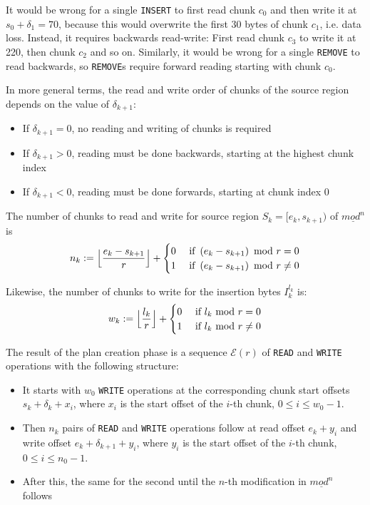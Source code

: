 \documentclass[english, 10pt, openright, twocolumn, landscape, twoside, notitlepage, a4paper, pdftex]		
{article}
\begin{document}
It would be wrong for a single \texttt{INSERT} to first read chunk $c_{0}$ and then write it at $s_{0}+\delta_{1}=70$, because this would overwrite the first 30 bytes of chunk $c_{1}$, i.e. data loss. Instead, it requires backwards read-write: First read chunk $c_{3}$ to write it at 220, then chunk $c_{2}$ and so on. Similarly, it would be wrong for a single \texttt{REMOVE} to read backwards, so \texttt{REMOVE}s require forward reading starting with chunk $c_{0}$.

In more general terms, the read and write order of chunks of the source region depends on the value of $\delta_{k+1}$:
\begin{itemize}
\item If $\delta_{k+1}=0$, no reading and writing of chunks is required
\item If $\delta_{k+1}>0$, reading must be done backwards, starting at the highest chunk index
\item If $\delta_{k+1}<0$, reading must be done forwards, starting at chunk index 0
\end{itemize}

The number of chunks to read and write for source region $S_{k}=[e_{k},s_{k+1})$ of $\underline{mod^{n}}$ is 
\[n_{k}:=\Bigl\lfloor\frac{e_{k}-s_{k+1}}{r}\Bigr\rfloor+
\begin{cases}
0 & \text{ if }\left(e_{k}-s_{k+1}\right)\text{ mod } r = 0\\
1 & \text{ if }\left(e_{k}-s_{k+1}\right)\text{ mod } r \neq 0\\
\end{cases}
\]

Likewise, the number of chunks to write for the insertion bytes $I_{k}^{l_{k}}$ is:
\[w_{k}:=\Bigl\lfloor\frac{l_{k}}{r}\Bigr\rfloor+
\begin{cases}
0 & \text{ if }l_{k}\text{ mod } r = 0\\
1 & \text{ if }l_{k}\text{ mod } r \neq 0\\
\end{cases}
\]

The result of the plan creation phase is a sequence $\mathcal{E}(r)$ of \texttt{READ} and \texttt{WRITE} operations with the following structure:
\begin{itemize}
\item It starts with $w_{0}$ \texttt{WRITE} operations at the corresponding chunk start offsets $s_{k}+\delta_{k}+x_{i}$, where $x_{i}$ is the start offset of the $i$-th chunk, $0\leq i\leq w_{0}-1$.
\item Then $n_{k}$ pairs of \texttt{READ} and \texttt{WRITE} operations follow at read offset $e_{k}+y_{i}$ and write offset $e_{k}+\delta_{k+1}+y_{i}$, where $y_{i}$ is the start offset of the $i$-th chunk, $0\leq i\leq n_{0}-1$.
\item After this, the same for the second until the $n$-th modification in $\underline{mod^{n}}$ follows
\end{itemize}
\end{document}
